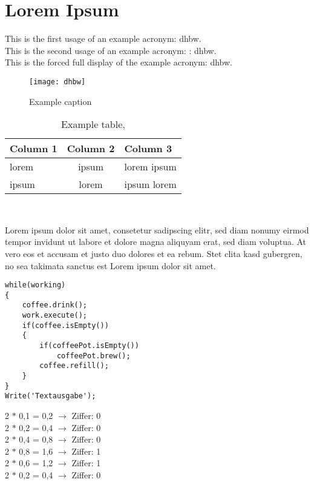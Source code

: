 \chapter{Lorem Ipsum}\label{ch:lorem-ipsum}
This is the first usage of an example acronym: \ac{dhbw}.\\
This is the second usage of an example acronym: : \ac{dhbw}.\\
This is the forced full display of the example acronym: \acf{dhbw}.

\begin{figure}[h]
    \centering
    \texttt{[image: dhbw]}
    \caption{Example caption}\label{fig:figure}
\end{figure}


\begin{table}[htbp]         %
    \begin{tabular}{lcl}        %
        \hline                  %
        \textbf{Column 1} & \textbf{Column 2} & \textbf{Column 3} \\ \hline    %
        lorem             & ipsum             & lorem ipsum       \\
        ipsum             & lorem             & ipsum lorem
    \end{tabular}~\caption{Example table, \cite{lorem}}
    \label{tab:table1}
\end{table}

Lorem ipsum dolor sit amet, consetetur sadipscing elitr, sed diam nonumy eirmod tempor invidunt ut labore et dolore magna aliquyam erat, sed diam voluptua. At vero eos et accusam et justo duo dolores et ea rebum. Stet clita kasd gubergren, no sea takimata sanctus est Lorem ipsum dolor sit amet. \cite{lorem}

\newpage
\begin{lstlisting}[caption=This is a listing,label=lst:code]
while(working)
{
    coffee.drink();
    work.execute();
    if(coffee.isEmpty())
    {
        if(coffeePot.isEmpty())
            coffeePot.brew();
        coffee.refill();
    }
}
Write('Textausgabe');
\end{lstlisting}


\begin{center}
    2 $\ast$ 0,1 = 0,2 $\rightarrow$ Ziffer: 0 \\
    2 $\ast$ 0,2 = 0,4 $\rightarrow$ Ziffer: 0 \\
    2 $\ast$ 0,4 = 0,8 $\rightarrow$ Ziffer: 0 \\
    2 $\ast$ 0,8 = 1,6 $\rightarrow$ Ziffer: 1 \\
    2 $\ast$ 0,6 = 1,2 $\rightarrow$ Ziffer: 1 \\
    2 $\ast$ 0,2 = 0,4 $\rightarrow$ Ziffer: 0 \\
\end{center}


